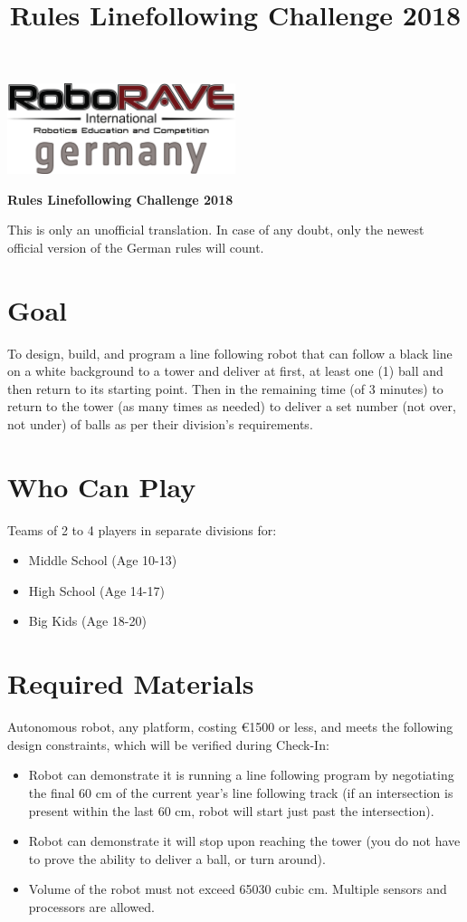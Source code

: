 \documentclass[a4paper,12pt]{article}
\begin{document}
\title{Rules Linefollowing Challenge 2018}

 \begin{center}
\includegraphics[width=0.5\textwidth]{logo.png}

\huge                      %
\bfseries                   %
Rules Linefollowing Challenge 2018
  \end{center}
   This is only an unofficial translation. In case of any doubt, only the newest official version of the German rules will
   count.
\section{Goal}
To design, build, and program a line following robot that can follow a black line on a white
background to a tower and deliver at first, at least one (1) ball and then return to its starting
point. Then in the remaining time (of 3 minutes) to return to the tower (as many times as
needed) to deliver a set number
(not over, not under) of balls as per their division’s
requirements.
\section{Who Can Play}
Teams of 2 to 4 players in separate divisions for:
\begin{itemize}
		\item Middle School (Age 10-13)
		\item High School (Age 14-17)
		\item Big Kids (Age 18-20)
\end{itemize}
\section{Required Materials}
Autonomous robot, any platform, costing \euro{1500}  or less, and meets the following design
constraints, which will be verified during Check-In:

\begin{itemize}
	\item Robot can demonstrate it is running a line following program by negotiating the final 60 cm of
	the current year's line following track (if an intersection is present within the last 60 cm, robot
	will start just past the intersection).
	\item Robot can demonstrate it will stop upon reaching the tower (you do not have to prove the ability
	to deliver a ball, or turn around).
	\item Volume of the robot must not
	exceed 65030 cubic cm. Multiple sensors and processors are
	allowed.
\end{itemize}
\end{document}

